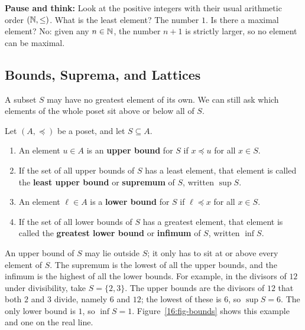 \begin{recoverybox}
\textbf{Pause and think:} Look at the positive integers with their usual arithmetic order $(\mathbb{N}, \le)$. What is the least element? The number $1$. Is there a maximal element? No: given any $n \in \mathbb{N}$, the number $n+1$ is strictly larger, so no element can be maximal.
\end{recoverybox}

\subsection{Bounds, Suprema, and Lattices}

A subset $S$ may have no greatest element of its own. We can still ask which elements of the whole poset sit above or below all of $S$.

\begin{definition}
Let $(A, \preceq)$ be a poset, and let $S \subseteq A$.
\begin{enumerate}[label=(\roman*)]
\item An element $u \in A$ is an \textbf{upper bound} for $S$ if $x \preceq u$ for all $x \in S$.
\item If the set of all upper bounds of $S$ has a least element, that element is called the \textbf{least upper bound} or \textbf{supremum} of $S$, written $\sup S$.
\item An element $\ell \in A$ is a \textbf{lower bound} for $S$ if $\ell \preceq x$ for all $x \in S$.
\item If the set of all lower bounds of $S$ has a greatest element, that element is called the \textbf{greatest lower bound} or \textbf{infimum} of $S$, written $\inf S$.
\end{enumerate}
\end{definition}

An upper bound of $S$ may lie outside $S$; it only has to sit at or above every element of $S$. The supremum is the lowest of all the upper bounds, and the infimum is the highest of all the lower bounds. For example, in the divisors of $12$ under divisibility, take $S = \{2, 3\}$. The upper bounds are the divisors of $12$ that both $2$ and $3$ divide, namely $6$ and $12$; the lowest of these is $6$, so $\sup S = 6$. The only lower bound is $1$, so $\inf S = 1$. Figure~\ref{16:fig-bounds} shows this example and one on the real line.


